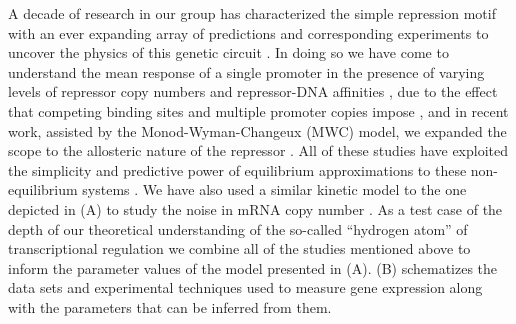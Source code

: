 A decade of research in our group has characterized the simple repression motif
with an ever expanding array of predictions and corresponding experiments to
uncover the physics of this genetic circuit \cite{Phillips2019}. In doing so
we have come to understand the mean response of a single promoter in the
presence of varying levels of repressor copy numbers and repressor-DNA
affinities \cite{Garcia2011c}, due to the effect that competing binding sites
and multiple promoter copies impose \cite{Brewster2014}, and in recent work,
assisted by the Monod-Wyman-Changeux (MWC) model, we expanded the scope to the
allosteric nature of the repressor \cite{Razo-Mejia2018}. All of these studies
have exploited the simplicity and predictive power of equilibrium approximations
to these non-equilibrium systems \cite{Buchler2003}. We have also used a similar
kinetic model to the one depicted in (A) to study the
noise in mRNA copy number \cite{Jones2014a}. As a test case of the depth of our
theoretical understanding of the so-called ``hydrogen atom'' of transcriptional
regulation we combine all of the studies mentioned above to inform the parameter
values of the model presented in (A).
(B) schematizes the data sets and experimental
techniques used to measure gene expression along with the parameters that can be
inferred from them.

